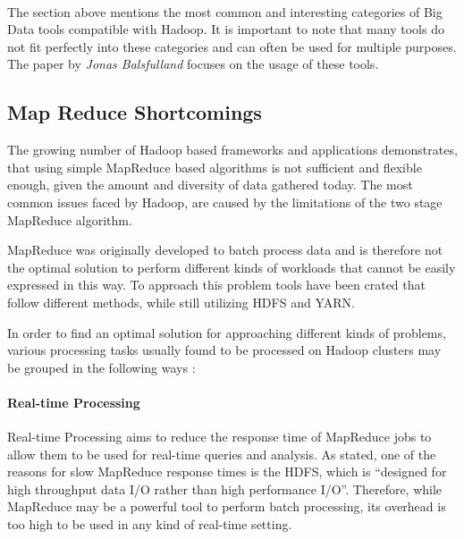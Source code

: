 \paragraph{}
The section above mentions the most common and interesting categories of Big Data tools compatible with Hadoop. It is important to note that many tools do not fit perfectly into these categories and can often be used for multiple purposes.
The paper by \emph{Jonas Balsfulland} focuses on the usage of these tools.

\subsection{Map Reduce Shortcomings}
\label{sec:fund:mapred_shortcomings}

The growing number of Hadoop based frameworks and applications demonstrates, that using simple MapReduce based algorithms is not sufficient and flexible enough, given the amount and diversity of data gathered today. The most common issues faced by Hadoop, are caused by the limitations of the two stage MapReduce algorithm.\autocite[][]{6903263} 

MapReduce was originally developed to batch process data and is
therefore not the optimal solution to perform different kinds of
workloads that cannot be easily expressed in this
way.\autocite{computers3040117}
To approach this problem tools have been crated that follow different methods, while still utilizing \ac{HDFS} and \ac{YARN}.

In order to find an optimal solution for approaching different kinds of problems, various processing tasks usually found to be processed on Hadoop clusters may be grouped in the following ways \autocite{computers3040117}:

\paragraph{Real-time Processing}
Real-time Processing aims to reduce the response time of MapReduce jobs to allow them to be used for real-time queries and analysis. As \autocite{computers3040117} stated, one of the reasons for slow MapReduce response times is the \ac{HDFS}, which is \enquote{designed for high throughput data I/O rather than high performance I/O}.
Therefore, while MapReduce may be a powerful tool to perform batch processing, its overhead is too high to be used in any kind of real-time setting.\autocite{computers3040117}

